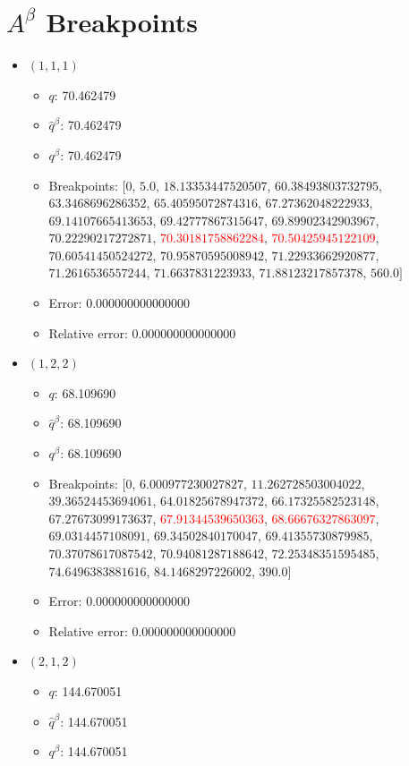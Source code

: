 \documentclass{article}%
\begin{document}
\section{$A^\beta$ Breakpoints}%
\thispagestyle{plain}%
\begin{itemize}%
	\item $(1, 1, 1)$%
	\begin{itemize}%
		\item $q$: 70.462479%
		\item $\hat{q}^\beta$: 70.462479%
		\item $q^\beta$: 70.462479%
		\item Breakpoints: $[$$0$, $5.0$, $18.13353447520507$, $60.38493803732795$, $63.3468696286352$, $65.40595072874316$, $67.27362048222933$, $69.14107665413653$, $69.42777867315647$, $69.89902342903967$, $70.22290217272871$, \textcolor{red}{$70.30181758862284$}, \textcolor{red}{$70.50425945122109$}, $70.60541450524272$, $70.95870595008942$, $71.22933662920877$, $71.2616536557244$, $71.6637831223933$, $71.88123217857378$, $560.0$$]$%
		\item Error: 0.000000000000000%
		\item Relative error: 0.000000000000000%
	\end{itemize}%
	\item $(1, 2, 2)$%
	\begin{itemize}%
		\item $q$: 68.109690%
		\item $\hat{q}^\beta$: 68.109690%
		\item $q^\beta$: 68.109690%
		\item Breakpoints: $[$$0$, $6.000977230027827$, $11.262728503004022$, $39.36524453694061$, $64.01825678947372$, $66.17325582523148$, $67.27673099173637$, \textcolor{red}{$67.91344539650363$}, \textcolor{red}{$68.66676327863097$}, $69.0314457108091$, $69.34502840170047$, $69.41355730879985$, $70.37078617087542$, $70.94081287188642$, $72.25348351595485$, $74.6496383881616$, $84.1468297226002$, $390.0$$]$%
		\item Error: 0.000000000000000%
		\item Relative error: 0.000000000000000%
	\end{itemize}%
	\item $(2, 1, 2)$%
	\begin{itemize}%
		\item $q$: 144.670051%
		\item $\hat{q}^\beta$: 144.670051%
		\item $q^\beta$: 144.670051%

\end{itemize}
\end{itemize}
\end{document}
